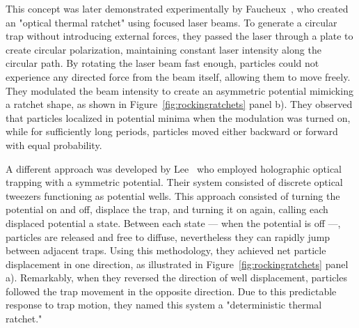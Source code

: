 This concept was later demonstrated experimentally by Faucheux~\cite{faucheux1995optical}, who created an "optical thermal ratchet" using focused laser beams. To generate a circular trap without introducing external forces, they passed the laser through a plate to create circular polarization, maintaining constant laser intensity along the circular path. By rotating the laser beam fast enough, particles could not experience any directed force from the beam itself, allowing them to move freely. They modulated the beam intensity to create an asymmetric potential mimicking a ratchet shape, as shown in Figure~\ref{fig:rockingratchets} panel b). They observed that particles localized in potential minima when the modulation was turned on, while for sufficiently long periods, particles moved either backward or forward with equal probability.


A different approach was developed by Lee~\cite{lee2005observation} who employed holographic optical trapping with a symmetric potential. Their system consisted of discrete optical tweezers functioning as potential wells. This approach consisted of turning the potential on and off, displace the trap, and turning it on again, calling each displaced potential a state. Between each state — when the potential is off —, particles are released and free to diffuse, nevertheless they can rapidly jump between adjacent traps. Using this methodology, they achieved net particle displacement in one direction, as illustrated in Figure~\ref{fig:rockingratchets} panel a). Remarkably, when they reversed the direction of well displacement, particles followed the trap movement in the opposite direction. Due to this predictable response to trap motion, they named this system a "deterministic thermal ratchet."

